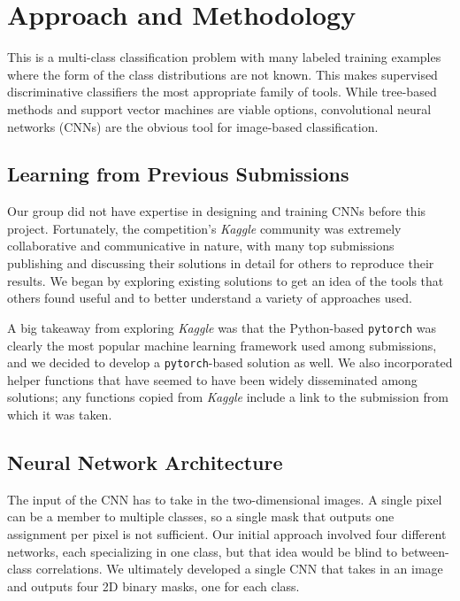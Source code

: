 \section{Approach and Methodology}
This is a multi-class classification problem with many labeled training examples where the form of the class distributions are not known. This makes supervised discriminative classifiers the most appropriate family of tools. While tree-based methods and support vector machines are viable options, convolutional neural networks (CNNs) are the obvious tool for image-based classification.

\subsection{Learning from Previous Submissions}
Our group did not have expertise in designing and training CNNs before this project. Fortunately, the competition's \textit{Kaggle} community was extremely collaborative and communicative in nature, with many top submissions publishing and discussing their solutions in detail for others to reproduce their results. We began by exploring existing solutions to get an idea of the tools that others found useful and to better understand a variety of approaches used. 

A big takeaway from exploring \textit{Kaggle} was that the Python-based \texttt{pytorch} was clearly the most popular machine learning framework used among submissions, and we decided to develop a \texttt{pytorch}-based solution as well. We also incorporated helper functions that have seemed to have been widely disseminated among solutions; any functions copied from \textit{Kaggle} include a link to the submission from which it was taken. 

\subsection{Neural Network Architecture}
The input of the CNN has to take in the two-dimensional images. A single pixel can be a member to multiple classes, so a single mask that outputs one assignment per pixel is not sufficient. Our initial approach involved four different networks, each specializing in one class, but that idea would be blind to between-class correlations. We ultimately developed a single CNN that takes in an image and outputs four 2D binary masks, one for each class. 

